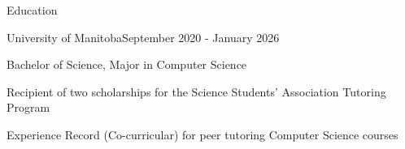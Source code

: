 \begin{resume_section}{Education}
    \begin{resume_subsection}{University of Manitoba}{September 2020 - January 2026}
        \begin{subitems}
            \item Bachelor of Science, Major in Computer Science
            \item Recipient of two scholarships for the Science Students' Association Tutoring Program
            \item Experience Record (Co-curricular) for peer tutoring Computer Science courses
        \end{subitems}
    \end{resume_subsection}
\end{resume_section}

